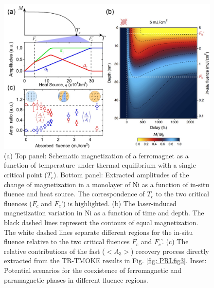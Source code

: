 \begin{figure}
\label{fig: PRLfig4}
\begin{center}
	\includegraphics[width=150mm]{figs/PRLFig4}
\end{center}
\caption{(a) Top panel: Schematic magnetization of a ferromagnet as a function of temperature under thermal equilibrium with a single critical point ($T_c$). Bottom panel: Extracted amplitudes of the change of magnetization in a monolayer of Ni as a function of in-situ fluence and heat source. The correspondence of $T_c$ to the two critical fluences ($F_c$ and $F_c$') is highlighted. (b) The laser-induced magnetization variation in Ni as a function of time and depth. The black dashed lines represent the contours of equal magnetization. The white dashed lines separate different regions for the in-situ fluence relative to the two critical fluences $F_c$ and $F_c$'. (c) The relative contributions of the fast ($<A_3>$) recovery process directly extracted from the TR-TMOKE results in Fig. \ref{fig: PRLfig3}. Inset: Potential scenarios for the coexistence of ferromagnetic and paramagnetic phases in different fluence regions.}
\end{figure}


